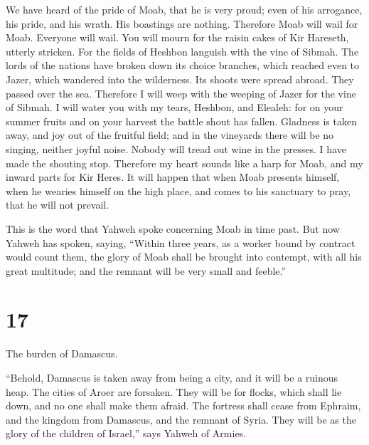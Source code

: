  We have heard of the pride of Moab, that he is very proud;
even of his arrogance, his pride, and his wrath. His boastings are
nothing.  Therefore Moab will wail for Moab. Everyone will
wail. You will mourn for the raisin cakes of Kir Hareseth, utterly
stricken.  For the fields of Heshbon languish with the vine
of Sibmah. The lords of the nations have broken down its choice
branches, which reached even to Jazer, which wandered into the
wilderness. Its shoots were spread abroad. They passed over the sea.
 Therefore I will weep with the weeping of Jazer for the
vine of Sibmah. I will water you with my tears, Heshbon, and Elealeh:
for on your summer fruits and on your harvest the battle shout has
fallen.  Gladness is taken away, and joy out of the
fruitful field; and in the vineyards there will be no singing, neither
joyful noise. Nobody will tread out wine in the presses. I have made the
shouting stop.  Therefore my heart sounds like a harp for
Moab, and my inward parts for Kir Heres.  It will happen
that when Moab presents himself, when he wearies himself on the high
place, and comes to his sanctuary to pray, that he will not prevail.

 This is the word that Yahweh spoke concerning Moab in time
past.  But now Yahweh has spoken, saying, ``Within three
years, as a worker bound by contract would count them, the glory of Moab
shall be brought into contempt, with all his great multitude; and the
remnant will be very small and feeble.''

\hypertarget{section-16}{%
\section{17}\label{section-16}}

 The burden of Damascus.

``Behold, Damascus is taken away from being a city, and it will be a
ruinous heap.  The cities of Aroer are forsaken. They will
be for flocks, which shall lie down, and no one shall make them afraid.
 The fortress shall cease from Ephraim, and the kingdom from
Damascus, and the remnant of Syria. They will be as the glory of the
children of Israel,'' says Yahweh of Armies.

